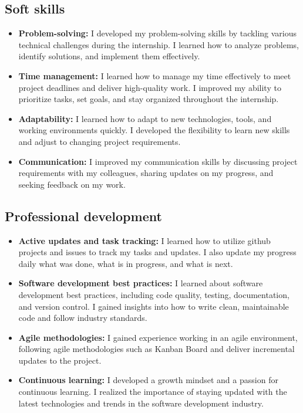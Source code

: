 \subsection{Soft skills}
\label{subsec:learning_challenges:soft_skills}

\begin{itemize}
    \item \textbf{Problem-solving:} I developed my problem-solving skills by tackling various technical challenges during the internship. I learned how to analyze problems, identify solutions, and implement them effectively.
    \item \textbf{Time management:} I learned how to manage my time effectively to meet project deadlines and deliver high-quality work. I improved my ability to prioritize tasks, set goals, and stay organized throughout the internship.
    \item \textbf{Adaptability:} I learned how to adapt to new technologies, tools, and working environments quickly. I developed the flexibility to learn new skills and adjust to changing project requirements.
    \item \textbf{Communication:} I improved my communication skills by discussing project requirements with my colleagues, sharing updates on my progress, and seeking feedback on my work.
\end{itemize}

\subsection{Professional development}
\label{subsec:learning_challenges:professional_development}

\begin{itemize}
    \item \textbf{Active updates and task tracking:} I learned how to utilize github projects and issues to track my tasks and updates. I also update my progress daily what was done, what is in progress, and what is next.
    \item \textbf{Software development best practices:} I learned about software development best practices, including code quality, testing, documentation, and version control. I gained insights into how to write clean, maintainable code and follow industry standards.
    \item \textbf{Agile methodologies:} I gained experience working in an agile environment, following agile methodologies such as Kanban Board and deliver incremental updates to the project.
    \item \textbf{Continuous learning:} I developed a growth mindset and a passion for continuous learning. I realized the importance of staying updated with the latest technologies and trends in the software development industry.
\end{itemize}

